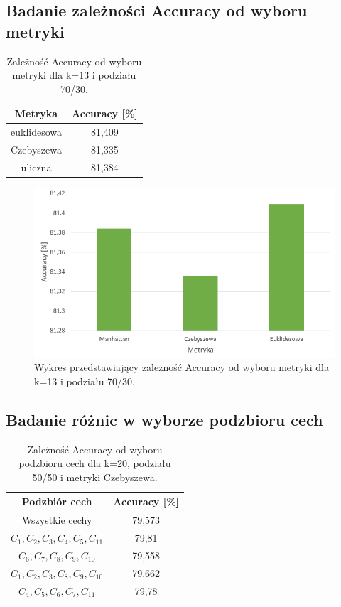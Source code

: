 \documentclass{classrep}
\begin{document}
\newpage
\subsection{Badanie zależności Accuracy od wyboru metryki}

\begin{table}[h!]
	\centering
	\begin{tabular} {c c}
		\hline
		\textbf{Metryka} & \textbf{Accuracy [\%]} \\ [0.5ex] 
		\hline
		\hline 
		euklidesowa & 81,409 \\ 
		Czebyszewa & 81,335 \\
		uliczna & 81,384 \\
		\hline
	\end{tabular}
	\caption{Zależność Accuracy od wyboru metryki dla k=13 i podziału 70/30. }
	\label{tabelaMetric}
\end{table}

\begin{figure}[h!]
    \centering
    \includegraphics[width=1\textwidth]{accuracyMetric.png}
    \caption{Wykres przedstawiający zależność Accuracy od wyboru metryki dla k=13 i podziału 70/30.}
    \label{accuracyMetric}
\end{figure}

\newpage
\subsection{Badanie różnic w wyborze podzbioru cech}
\begin{table}[h!]
	\centering
	\begin{tabular} {c c}
		\hline
		\textbf{Podzbiór cech} & \textbf{Accuracy [\%]} \\ [0.5ex] 
		\hline
		\hline 
		Wszystkie cechy & 79,573 \\ 
		$C_1, C_2, C_3, C_4, C_5, C_{11}$ & 79,81 \\
		$C_6, C_7, C_8, C_9, C_{10}$ & 79,558 \\
		$C_1, C_2, C_3, C_8, C_9, C_{10}$ & 79,662 \\
		$C_4, C_5, C_6, C_7, C_{11}$ & 79,78 \\
		\hline
	\end{tabular}
	\caption{Zależność Accuracy od wyboru podzbioru cech dla k=20, podziału 50/50 i metryki Czebyszewa. }
	\label{tabelaFeatures}
\end{table}
\end{document}
